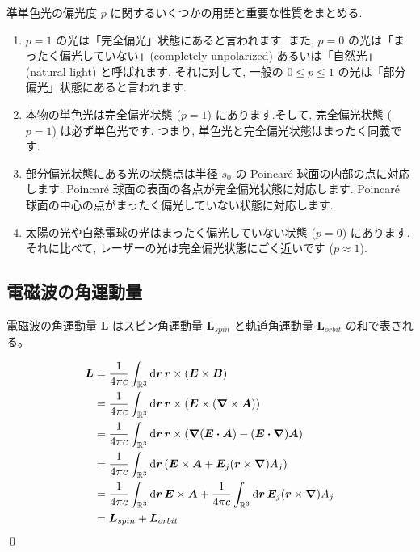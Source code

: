 \documentclass[uplatex,dvipdfmx,a4paper,11pt]{jlreq}
\makeatletter
\newcommand{\RR}{\mathbb{R}}
\newcommand{\EE}{\bm{E}}
\newcommand{\BB}{\bm{B}}
\renewcommand{\AA}{\bm{A}}
\newcommand{\rr}{\bm{r}}
\newcommand{\LL}{\bm{L}}
\theoremstyle{definition}
\renewenvironment{proof}[1][\proofname]{\par
  \normalfont
  \topsep6\p@\@plus6\p@ \trivlist
  \item[\hskip\labelsep{\bfseries #1}\@addpunct{\bfseries}]\ignorespaces\quad\par
}{%
  \qed\endtrivlist\@endpefalse
}
\renewcommand\proofname{証明}
\makeatother
\begin{document}
準単色光の偏光度 $p$ に関するいくつかの用語と重要な性質をまとめる.
\begin{enumerate}
  \item $p = 1$ の光は「完全偏光」状態にあると言われます. また, $p = 0$ の光は「まったく偏光していない」(completely unpolarized) あるいは「自然光」(natural light) と呼ばれます. それに対して, 一般の $0 \leq p \leq 1$ の光は「部分偏光」状態にあると言われます.
  \item 本物の単色光は完全偏光状態 ($p = 1$) にあります.そして, 完全偏光状態 ($p = 1$) は必ず単色光です. つまり, 単色光と完全偏光状態はまったく同義です.
  \item 部分偏光状態にある光の状態点は半径 $s_0$ の Poincaré 球面の内部の点に対応します. Poincaré 球面の表面の各点が完全偏光状態に対応します. Poincaré 球面の中心の点がまったく偏光していない状態に対応します.
  \item 太陽の光や白熱電球の光はまったく偏光していない状態 ($p = 0$) にあります. それに比べて, レーザーの光は完全偏光状態にごく近いです ($p \approx 1$).
\end{enumerate}

\subsection{電磁波の角運動量}
\begin{theorem}
  電磁波の角運動量 $\LL$ はスピン角運動量 $\LL_{spin}$ と軌道角運動量 $\LL_{orbit}$ の和で表される。
\end{theorem}
\begin{proof}
  \begin{align}
    \LL & = \frac{1}{4\pi c}\int_{\RR^3}\dd{\rr}\rr\times(\EE\times\BB)                                                       \\
        & = \frac{1}{4\pi c}\int_{\RR^3}\dd{\rr}\rr\times(\EE\times(\vnabla\times\AA))                                        \\
        & = \frac{1}{4\pi c}\int_{\RR^3}\dd{\rr}\rr\times(\vnabla(\EE\vdot\AA) - (\EE\vdot\vnabla)\AA)                        \\
        & = \frac{1}{4\pi c}\int_{\RR^3}\dd{\rr}\qty(\EE\times\AA + \EE_j(\rr\times\vnabla)A_j)                               \\
        & = \frac{1}{4\pi c}\int_{\RR^3}\dd{\rr}\EE\times\AA + \frac{1}{4\pi c}\int_{\RR^3}\dd{\rr}\EE_j(\rr\times\vnabla)A_j \\
        & = \LL_{spin} + \LL_{orbit}
  \end{align}
\end{proof}
\end{document}
